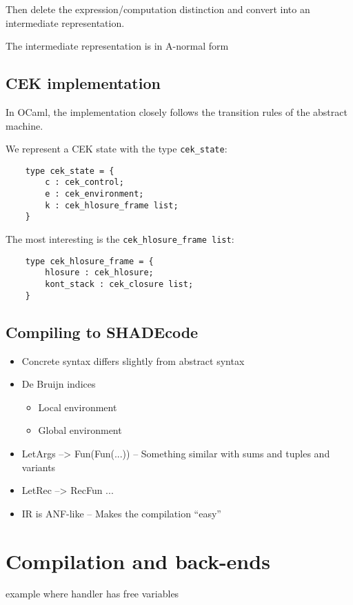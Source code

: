 \documentclass[class=article, crop=false]{standalone}
\begin{document}
Then delete the expression/computation distinction and convert into
an intermediate representation.

The intermediate representation is in A-normal form 

\subsection{CEK implementation}

In OCaml, the implementation closely follows the transition rules of the abstract machine.

We represent a CEK state with the type \verb|cek_state|:
\begin{verbatim}
    type cek_state = {
        c : cek_control;
        e : cek_environment;
        k : cek_hlosure_frame list;
    }
\end{verbatim}

The most interesting is the \verb|cek_hlosure_frame list|:
\begin{verbatim}
    type cek_hlosure_frame = {
        hlosure : cek_hlosure;
        kont_stack : cek_closure list;
    }
\end{verbatim}

\subsection{Compiling to SHADEcode}


\begin{itemize}
\item Concrete syntax differs slightly from abstract syntax
\item De Bruijn indices
\begin{itemize}
    \item Local environment
    \item Global environment
\end{itemize}
\item LetArgs --> Fun(Fun(...)) -- Something similar with sums and tuples and variants
\item LetRec --> RecFun ...
\item IR is ANF-like -- Makes the compilation ``easy''
\end{itemize}

\section{Compilation and back-ends}

example where handler has free variables
\end{document}
